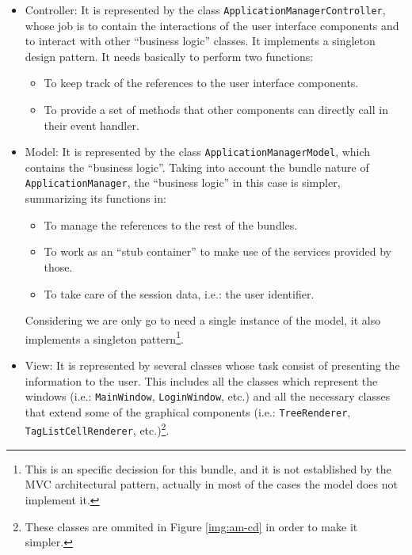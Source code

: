 \begin{itemize}
	\item Controller: It is represented by the class
 	 \verb|ApplicationManagerController|, whose job is to contain the interactions
 	 of the user interface components and to interact with other ``business logic''
  	classes. It implements a singleton design pattern.
  	It needs basically to perform two functions:
	\begin{itemize}
  		\item To keep track of the references to the user interface components.
  		\item To provide a set of methods that other components can directly call in
  		their event handler.
    \end{itemize}
    
 	\item Model: It is represented by the class \verb|ApplicationManagerModel|,
 	which contains the ``business logic''. Taking into account the bundle nature
 	of\\ \verb|ApplicationManager|, the ``business logic'' in this case is
 	simpler, summarizing its functions in: 
	\begin{itemize}
  		\item To manage the references to the rest of the bundles.
  		\item To work as an ``stub container'' to make use of the services provided
  		by those.
  		\item To take care of the session data, i.e.: the user identifier.
    \end{itemize}
    Considering we are only go to need a single instance of the model, it also
    implements a singleton pattern\footnote{This is an specific decission for 
   this bundle, and it is not established by the MVC architectural pattern,
   actually in most of the cases the model does not implement it. }.
    
    \item View: It is represented by several classes whose task consist of
    presenting the information to the user. This includes all the classes which
    represent the windows (i.e.: \verb|MainWindow|, \verb|LoginWindow|, etc.)
    and all the necessary classes that extend some of the graphical components (i.e.:
    \verb|TreeRenderer|, \verb|TagListCellRenderer|, etc.)\footnote{These
    classes are ommited in Figure \ref{img:am-cd} in order to make it simpler.}.
\end{itemize}

